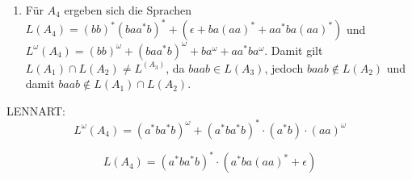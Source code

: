 \documentclass[a4paper]{scrartcl}
\begin{document}
\begin{enumerate}
\begin{equation*}
\begin{tikzpicture}[->,>=stealth',shorten >=1pt,auto,node distance=2.5cm,
   semithick]
			\node[initial,accepting, state] 	(A)		{$q,s,1$};
			\node[state]	(B)	[right of=A]	{$r,t,2$};
			\node[state]			(C)	[above of=B]	{$r,t,1$};
			\node[state]			(D)	[below of=A]	{$p,t,2$};
			\node[state, accepting]			(E)	[below of=D]	{$p,t,1$};
			\node[state]			(F) [right of=D]	{$q,s,2$};		
	
				\path 	(A) 	edge 			 	node {a} (F)
								edge [bend left]	node {b} (B)
								edge 				node {b} (D)
						(B)		edge [bend left]	node {b} (A)
								edge 				node {a} (C)
						(C)		edge				node {b} (A)
								edge [loop right]	node {a} (C)
						(D)		edge [bend left]	node {a} (E)
						(E)		edge [bend left]	node {a} (D)
						(F)		edge [loop right]	node {a} (F)
								edge 				node {b} (D);
	\end{tikzpicture}
\end{equation*}
\item
Für $A_4$ ergeben sich die Sprachen $L(A_4)=(bb)^{*}(baa^{*}b)^{*}+(\epsilon + ba(aa)^{*}+aa^{*}ba(aa)^{*})$ und $L^{\omega}(A_4)=(bb)^{\omega}+(baa^{*}b)^{\omega}+ba^{\omega}+aa^{*}ba^{\omega}$. Damit gilt $L(A_1)\cap L(A_2)\neq L^(A_3)$, da $baab\in L(A_3)$, jedoch $baab\notin L(A_2)$ und damit $baab\notin L(A_1)\cap L(A_2)$.
\end{enumerate}

LENNART:
$$ L^\omega (A_4) = (a^* b a^* b)^\omega + (a^* b a^* b)^* \cdot (a^*b) \cdot (aa)^\omega $$ 

$$ L(A_4) = (a^* b a^* b)^* \cdot (a^* b a (aa)^* + \epsilon) $$ 
\end{document}
